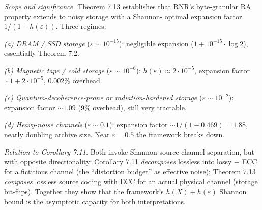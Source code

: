 \documentclass[
]{article}
\begin{document}
\emph{Scope and significance.} Theorem 7.13 establishes that RNR's
byte-granular RA property extends to noisy storage with a Shannon-
optimal expansion factor $1/(1 - h(\varepsilon))$. Three regimes:

\emph{(a) DRAM / SSD storage} ($\varepsilon \sim 10^{-15}$): negligible
expansion ($1 + 10^{-15} \cdot \log 2$), essentially Theorem 7.2.

\emph{(b) Magnetic tape / cold storage} ($\varepsilon \sim 10^{-6}$):
$h(\varepsilon) \approx 2 \cdot 10^{-5}$, expansion factor
$\sim 1 + 2 \cdot 10^{-5}$, $0.002\%$ overhead.

\emph{(c) Quantum-decoherence-prone or radiation-hardened storage}
($\varepsilon \sim 10^{-2}$): expansion factor $\sim 1.09$ (9\%
overhead), still very tractable.

\emph{(d) Heavy-noise channels} ($\varepsilon \sim 0.1$): expansion
factor $\sim 1/(1 - 0.469) = 1.88$, nearly doubling archive size.
Near $\varepsilon = 0.5$ the framework breaks down.

\emph{Relation to Corollary 7.11.} Both invoke Shannon source-channel
separation, but with opposite directionality:
Corollary 7.11 \emph{decomposes} lossless into lossy + ECC for a
fictitious channel (the ``distortion budget'' as effective noise);
Theorem 7.13 \emph{composes} lossless source coding with ECC for
an actual physical channel (storage bit-flips). Together they show
that the framework's $h(X) + h(\varepsilon)$ Shannon bound is the
asymptotic capacity for both interpretations.
\end{document}
